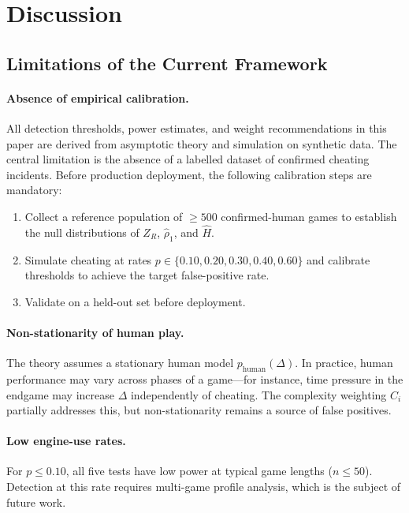 \documentclass[11pt,a4paper]{article}
\begin{document}
\section{Discussion}
\label{sec:discussion}

\subsection{Limitations of the Current Framework}

\paragraph{Absence of empirical calibration.}
All detection thresholds, power estimates, and weight recommendations in
this paper are derived from asymptotic theory and simulation on synthetic
data. The central limitation is the absence of a labelled dataset of
confirmed cheating incidents. Before production deployment, the following
calibration steps are mandatory:
\begin{enumerate}[label=(\roman*)]
\item Collect a reference population of $\geq 500$ confirmed-human games
  to establish the null distributions of $Z_R$, $\hat{\rho}_1$, and $\hat{H}$.
\item Simulate cheating at rates $p \in \{0.10, 0.20, 0.30, 0.40, 0.60\}$
  and calibrate thresholds to achieve the target false-positive rate.
\item Validate on a held-out set before deployment.
\end{enumerate}

\paragraph{Non-stationarity of human play.}
The theory assumes a stationary human model $p_{\mathrm{human}}(\Delta)$.
In practice, human performance may vary across phases of a game---for
instance, time pressure in the endgame may increase $\Delta$ independently
of cheating. The complexity weighting $C_i$ partially addresses this, but
non-stationarity remains a source of false positives.

\paragraph{Low engine-use rates.}
For $p \leq 0.10$, all five tests have low power at typical game lengths
($n \leq 50$). Detection at this rate requires multi-game profile analysis,
which is the subject of future work.
\end{document}
